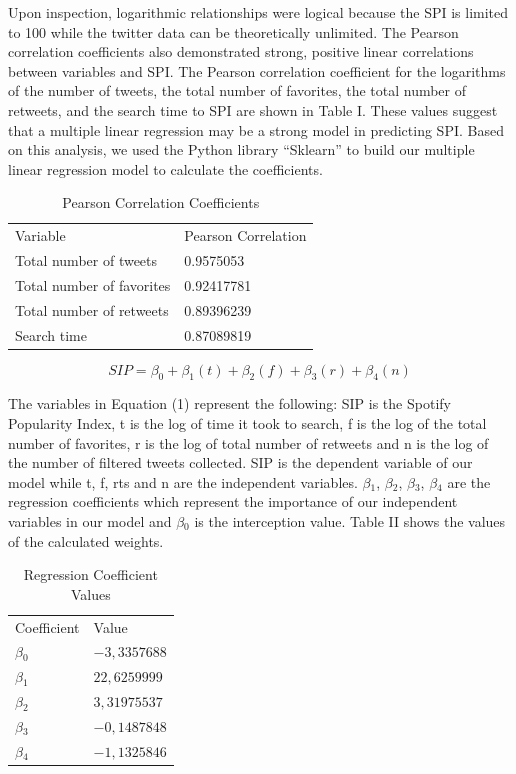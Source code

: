 \documentclass[12pt,conference]{IEEEtran}
\begin{document}
Upon inspection, logarithmic relationships were logical because the SPI is limited to 100 while the twitter data can be theoretically unlimited. The Pearson correlation coefficients also demonstrated strong, positive linear correlations between variables and SPI. The Pearson correlation coefficient for the logarithms of the number of tweets, the total number of favorites, the total number of retweets, and the search time to SPI are shown in Table I. These values suggest that a multiple linear regression may be a strong model in predicting SPI. Based on this analysis, we used the Python library ``Sklearn'' to build our multiple linear regression model to calculate the coefficients.

\begin{table}[htb!]
\centering
\caption{Pearson Correlation Coefficients}
{\begin{tabular}{l|l}
Variable                    & Pearson Correlation  \\
Total number of tweets      & 0.9575053             \\
Total number of favorites   & 0.92417781            \\
Total number of retweets    & 0.89396239            \\
Search time                 & 0.87089819
\end{tabular}}
\end{table}

\begin{equation}\label{my_first_eqn}
        SIP = \beta_{0} + \beta_{1}(t) + \beta_{2}(f) + \beta_{3}(r) + \beta_{4}(n)
\end{equation}

The variables in Equation (1) represent the following: SIP is the Spotify Popularity Index, t is the log of time it took to search, f is the log of the total number of favorites, r is the log of total number of retweets and n is the log of the number of filtered tweets collected. SIP is the dependent variable of our model while t, f, rts and n are the independent variables. $\beta{_1}$, $\beta{_2}$, $\beta{_3}$, $\beta{_4}$ are the regression coefficients which represent the importance of our independent variables in our model and $\beta{_0}$ is the interception value. Table II shows the values of the calculated weights.

\begin{table}[htb!]
 \centering
  \caption{Regression Coefficient Values}
{\begin{tabular}{l|l}
Coefficient & Value \\
$\beta{_0}$ & $-3,3357688$ \\
$\beta{_1}$ & $22,6259999$ \\
$\beta{_2}$ & $3,31975537$ \\
$\beta{_3}$ & $-0,1487848$ \\
$\beta{_4}$ & $-1,1325846$ \\
\end{tabular}}
\end{table}
\end{document}
